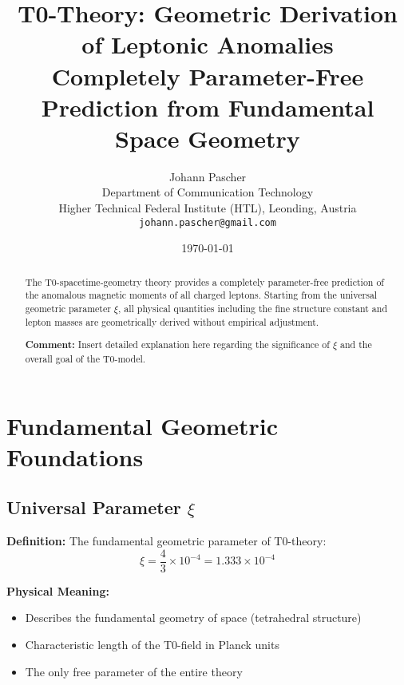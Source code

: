 \documentclass[12pt,a4paper]{article}
\newcommand{\xipar}{\xi}            %
\begin{document}
	
	\title{T0-Theory: Geometric Derivation of Leptonic Anomalies \\
		\large Completely Parameter-Free Prediction from Fundamental Space Geometry}
	\author{Johann Pascher\\
		Department of Communication Technology\\
		Higher Technical Federal Institute (HTL), Leonding, Austria\\
		\texttt{johann.pascher@gmail.com}}
	\date{\today}
	
	\maketitle
	
	\begin{abstract}
		The T0-spacetime-geometry theory provides a completely parameter-free prediction of the anomalous magnetic moments of all charged leptons. Starting from the universal geometric parameter $\xipar$, all physical quantities including the fine structure constant and lepton masses are geometrically derived without empirical adjustment.
		
		\textbf{Comment:} Insert detailed explanation here regarding the significance of $\xipar$ and the overall goal of the T0-model.
	\end{abstract}
	
	\tableofcontents
	\newpage
\section{Fundamental Geometric Foundations}

\subsection{Universal Parameter $\xipar$}

\textbf{Definition:} The fundamental geometric parameter of T0-theory:
\begin{equation}
	\xipar = \frac{4}{3} \times 10^{-4} = 1{.}333 \times 10^{-4}
\end{equation}

\textbf{Physical Meaning:}
\begin{itemize}
	\item Describes the fundamental geometry of space (tetrahedral structure)
	\item Characteristic length of the T0-field in Planck units
	\item The only free parameter of the entire theory
\end{itemize}
\end{document}
